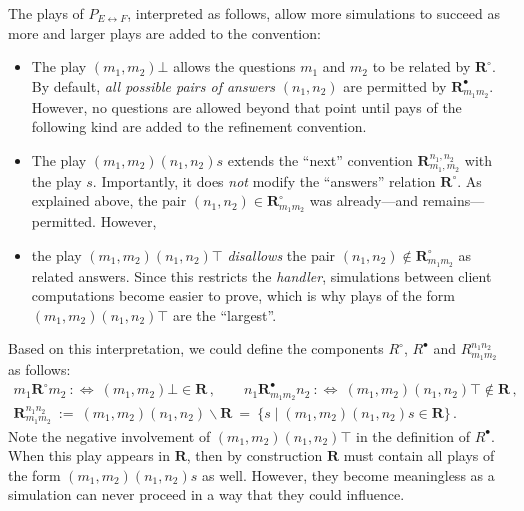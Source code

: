 \documentclass[acmsmall,screen,review,anonymous,nonacm]{acmart}
\begin{document}
The plays of $P_{E \leftrightarrow F}$, interpreted as follows,
allow more simulations to succeed as
more and larger plays are added to the convention:
\begin{itemize}
  \item The play $(m_1, m_2)\bot$
    allows the questions $m_1$ and $m_2$
    to be related by $\mathbf{R}^\circ$.
    By default,
    \emph{all possible pairs of answers} $(n_1, n_2)$
    are permitted by $\mathbf{R}^\bullet_{m_1m_2}$.
    However, no questions are allowed beyond that point
    until pays of the following kind are added to the refinement convention.
  \item The play $(m_1, m_2)(n_1,n_2) s$
    extends the ``next'' convention $\mathbf{R}^{n_1,n_2}_{m_1,m_2}$
    with the play $s$.
    Importantly, it does \emph{not} modify
    the ``answers'' relation $\mathbf{R}^\circ$.
    As explained above, the pair $(n_1, n_2) \in \mathbf{R}^\circ_{m_1m_2}$
    was already---and remains---permitted.
    However,
  \item the play $(m_1,m_2)(n_1,n_2) \top$ \emph{disallows} the pair
    $(n_1, n_2) \notin \mathbf{R}^\circ_{m_1m_2}$ as related answers.
    Since this restricts the \emph{handler},
    simulations between client computations become easier to prove,
    which is why plays of the form $(m_1,m_2)(n_1,n_2)\top$ are the ``largest''.
\end{itemize}
Based on this interpretation,
we could define the components $R^\circ$, $R^\bullet$
and $R_{m_1m_2}^{n_1n_2}$ as follows:
\begin{gather*}
  m_1 \mathrel{\mathbf{R}^\circ} m_2 \::\Leftrightarrow\:
    (m_1,m_2)\bot \in \mathbf{R}
  \,, \qquad
  n_1 \mathrel{\mathbf{R}^\bullet_{m_1m_2}} n_2 \::\Leftrightarrow\:
    (m_1,m_2)(n_1,n_2)\top \notin \mathbf{R}
  \,, \\[0.5ex]
  \mathbf{R}_{m_1m_2}^{n_1n_2} \: := \:
    (m_1,m_2)(n_1,n_2) \backslash \mathbf{R} \: = \:
    \{ s \mid (m_1,m_2)(n_1,n_2)s \in \mathbf{R} \}
  \,.
\end{gather*}
Note the negative involvement of $(m_1,m_2)(n_1,n_2)\top$
in the definition of $R^\bullet$.
When this play appears in $\mathbf{R}$,
then by construction $\mathbf{R}$ must contain
all plays of the form $(m_1,m_2)(n_1,n_2)s$ as well.
However, they become meaningless
as a simulation can never proceed
in a way that they could influence.
\end{document}
